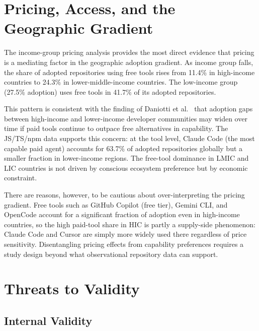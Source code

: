 \section{Pricing, Access, and the Geographic Gradient}
\label{sec:disc:pricing}

The income-group pricing analysis provides the most direct evidence that pricing is a mediating factor in the geographic adoption gradient. As income group falls, the share of adopted repositories using free tools rises from 11.4\% in high-income countries to 24.3\% in lower-middle-income countries. The low-income group (27.5\% adoption) uses free tools in 41.7\% of its adopted repositories.

This pattern is consistent with the finding of Daniotti et al.~\cite{daniotti2025} that adoption gaps between high-income and lower-income developer communities may widen over time if paid tools continue to outpace free alternatives in capability. The JS/TS/npm data supports this concern: at the tool level, Claude Code (the most capable paid agent) accounts for 63.7\% of adopted repositories globally but a smaller fraction in lower-income regions. The free-tool dominance in LMIC and LIC countries is not driven by conscious ecosystem preference but by economic constraint.

There are reasons, however, to be cautious about over-interpreting the pricing gradient. Free tools such as GitHub Copilot (free tier), Gemini CLI, and OpenCode account for a significant fraction of adoption even in high-income countries, so the high paid-tool share in HIC is partly a supply-side phenomenon: Claude Code and Cursor are simply more widely used there regardless of price sensitivity. Disentangling pricing effects from capability preferences requires a study design beyond what observational repository data can support.

\section{Threats to Validity}
\label{sec:disc:threats}

\subsection{Internal Validity}

